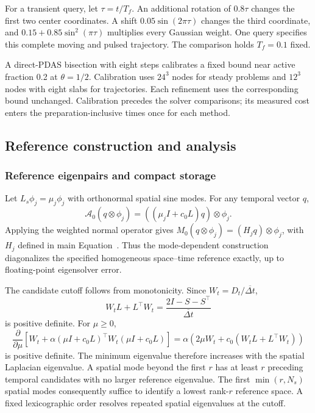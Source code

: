 For a transient query, let $\tau=t/T_f$.
An additional rotation of $0.8\tau$ changes the first two center
coordinates. A shift $0.05\sin(2\pi\tau)$ changes the third
coordinate, and $0.15+0.85\sin^2(\pi\tau)$ multiplies every
Gaussian weight. One query specifies this complete moving and
pulsed trajectory. The comparison holds $T_f=0.1$ fixed.

A direct-PDAS bisection with eight steps calibrates a fixed bound
near active fraction 0.2 at $\theta=1/2$. Calibration uses $24^3$
nodes for steady problems and $12^3$ nodes with eight slabs for
trajectories. Each refinement uses the corresponding bound unchanged.
Calibration precedes the solver comparisons; its measured cost enters
the preparation-inclusive times once for each method.

\subsection{Reference construction and analysis}


\subsubsection{Reference eigenpairs and compact storage}
\label{si:construction}
Let $L_s\phi_j=\mu_j\phi_j$ with orthonormal spatial sine modes.
For any temporal vector $q$,
\[
 \mathcal A_0(q\otimes\phi_j)
 =((\mu_jI+c_0L)q)\otimes\phi_j.
\]
Applying the weighted normal operator gives
$M_0(q\otimes\phi_j)=(H_jq)\otimes\phi_j$, with $H_j$ defined
in main Equation~.
Thus the mode-dependent construction diagonalizes the specified
homogeneous space--time reference exactly, up to floating-point
eigensolver error.

The candidate cutoff follows from monotonicity. Since
$W_t=D_t/\overline{\Delta t}$,
\[
 W_tL+L^\top W_t
 =\frac{2I-S-S^\top}{\overline{\Delta t}}
\]
is positive definite. For $\mu\geq0$,
\[
 \frac{\partial}{\partial\mu}
 \left[W_t+\alpha(\mu I+c_0L)^\top W_t(\mu I+c_0L)\right]
 =\alpha\left(2\mu W_t+c_0(W_tL+L^\top W_t)\right)
\]
is positive definite. The minimum eigenvalue therefore increases
with the spatial Laplacian eigenvalue. A spatial mode beyond the
first $r$ has at least $r$ preceding temporal candidates with
no larger reference eigenvalue. The first $\min(r,N_s)$ spatial
modes consequently suffice to identify a lowest rank-$r$ reference
space. A fixed lexicographic order resolves repeated spatial
eigenvalues at the cutoff.

